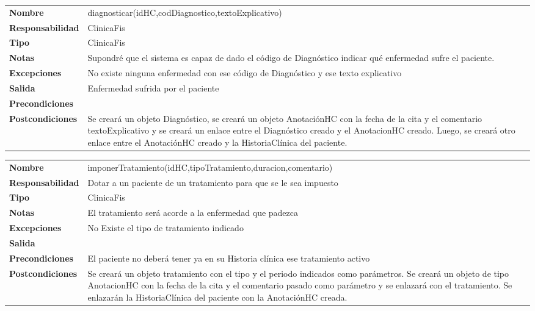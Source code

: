 \documentclass[11pt]{article}
\begin{document}
\begin{table}[htbp]
	  \begin{tabularx}{\textwidth}{l|l}
    \textbf{Nombre}        & diagnosticar(idHC,codDiagnostico,textoExplicativo) \\ 
    \textbf{Responsabilidad}  & ClinicaFis \\ 
    \textbf{Tipo}        &  ClinicaFis\\ 
    \textbf{Notas}        &  Supondré que el sistema es capaz de dado el código de Diagnóstico indicar qué enfermedad sufre el paciente.\\ 
    \textbf{Excepciones}    & No existe ninguna enfermedad con ese código de Diagnóstico y ese texto explicativo \\ 
    \textbf{Salida}        & Enfermedad sufrida por el paciente  \\ 
    \textbf{Precondiciones}    &  \\ 
    \textbf{Postcondiciones}  & Se creará un objeto Diagnóstico, se creará un objeto AnotaciónHC con la fecha de la cita y el comentario textoExplicativo y se creará un enlace entre el Diagnóstico creado y el AnotacionHC creado. Luego, se creará otro enlace entre el AnotaciónHC creado y la HistoriaClínica del paciente. \\ 
  \end{tabularx}

\end{table}


\begin{table}[htbp]
	  \begin{tabularx}{\textwidth}{l|l}
    \textbf{Nombre}        & imponerTratamiento(idHC,tipoTratamiento,duracion,comentario) \\ 
    \textbf{Responsabilidad}  & Dotar a un paciente de un tratamiento para que se le sea impuesto  \\ 
    \textbf{Tipo}        & ClinicaFis \\ 
    \textbf{Notas}        &  El tratamiento será acorde a la enfermedad que padezca\\ 
    \textbf{Excepciones}    & No Existe el tipo de tratamiento indicado \\ 
    \textbf{Salida}        &  \\ 
    \textbf{Precondiciones}    & El paciente no deberá tener ya en su Historia clínica ese tratamiento activo \\ 
    \textbf{Postcondiciones}  &  Se creará un objeto tratamiento con el tipo y el periodo indicados como parámetros. Se creará un objeto de tipo AnotacionHC con la fecha de la cita y el comentario pasado como parámetro y se enlazará con el tratamiento. Se enlazarán la HistoriaClínica del paciente con la AnotaciónHC creada.\\ 
  \end{tabularx}

\end{table}
\end{document}
